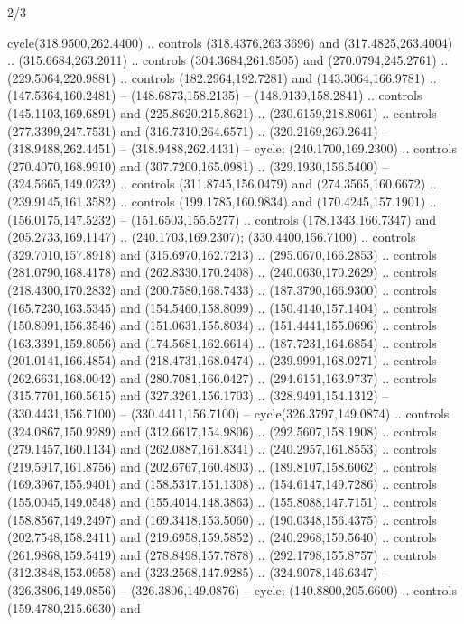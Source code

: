 \begin{flagdescription}{2/3}
\begin{scope}[yshift=0.5\flagwidth,xshift=0.4\flaglength,y=0.00183\flagwidth,x=0.00183\flagwidth,yscale=-1,inner sep=0pt,outer sep=0pt]
\begin{scope}[xshift=-0.517\flagwidth,yshift=-0.285\flagwidth]
\begin{scope}[cm={{1.42403,0.0,0.0,1.42403,(-59.10036,-127.66903)}},draw=black,fill=gold,line join=round,line cap=round,even odd rule,line width=0.0015\flagwidth]
  cycle(318.9500,262.4400) .. controls (318.4376,263.3696) and
  (317.4825,263.4004) .. (315.6684,263.2011) .. controls (304.3684,261.9505) and
  (270.0794,245.2761) .. (229.5064,220.9881) .. controls (182.2964,192.7281) and
  (143.3064,166.9781) .. (147.5364,160.2481) -- (148.6873,158.2135) --
  (148.9139,158.2841) .. controls (145.1103,169.6891) and (225.8620,215.8621) ..
  (230.6159,218.8061) .. controls (277.3399,247.7531) and (316.7310,264.6571) ..
  (320.2169,260.2641) -- (318.9488,262.4451) -- (318.9488,262.4431) -- cycle;
 (240.1700,169.2300) .. controls (270.4070,168.9910) and
  (307.7200,165.0981) .. (329.1930,156.5400) -- (324.5665,149.0232) .. controls
  (311.8745,156.0479) and (274.3565,160.6672) .. (239.9145,161.3582) .. controls
  (199.1785,160.9834) and (170.4245,157.1901) .. (156.0175,147.5232) --
  (151.6503,155.5277) .. controls (178.1343,166.7347) and (205.2733,169.1147) ..
  (240.1703,169.2307);
 (330.4400,156.7100) .. controls (329.7010,157.8918) and
  (315.6970,162.7213) .. (295.0670,166.2853) .. controls (281.0790,168.4178) and
  (262.8330,170.2408) .. (240.0630,170.2629) .. controls (218.4300,170.2832) and
  (200.7580,168.7433) .. (187.3790,166.9300) .. controls (165.7230,163.5345) and
  (154.5460,158.8099) .. (150.4140,157.1404) .. controls (150.8091,156.3546) and
  (151.0631,155.8034) .. (151.4441,155.0696) .. controls (163.3391,159.8056) and
  (174.5681,162.6614) .. (187.7231,164.6854) .. controls (201.0141,166.4854) and
  (218.4731,168.0474) .. (239.9991,168.0271) .. controls (262.6631,168.0042) and
  (280.7081,166.0427) .. (294.6151,163.9737) .. controls (315.7701,160.5615) and
  (327.3261,156.1703) .. (328.9491,154.1312) -- (330.4431,156.7100) --
  (330.4411,156.7100) -- cycle(326.3797,149.0874) .. controls
  (324.0867,150.9289) and (312.6617,154.9806) .. (292.5607,158.1908) .. controls
  (279.1457,160.1134) and (262.0887,161.8341) .. (240.2957,161.8553) .. controls
  (219.5917,161.8756) and (202.6767,160.4803) .. (189.8107,158.6062) .. controls
  (169.3967,155.9401) and (158.5317,151.1308) .. (154.6147,149.7286) .. controls
  (155.0045,149.0548) and (155.4014,148.3863) .. (155.8088,147.7151) .. controls
  (158.8567,149.2497) and (169.3418,153.5060) .. (190.0348,156.4375) .. controls
  (202.7548,158.2411) and (219.6958,159.5852) .. (240.2968,159.5640) .. controls
  (261.9868,159.5419) and (278.8498,157.7878) .. (292.1798,155.8757) .. controls
  (312.3848,153.0958) and (323.2568,147.9285) .. (324.9078,146.6347) --
  (326.3806,149.0856) -- (326.3806,149.0876) -- cycle;
 (140.8800,205.6600) .. controls (159.4780,215.6630) and

\end{scope}
\end{scope}
\end{scope}
\end{flagdescription}
